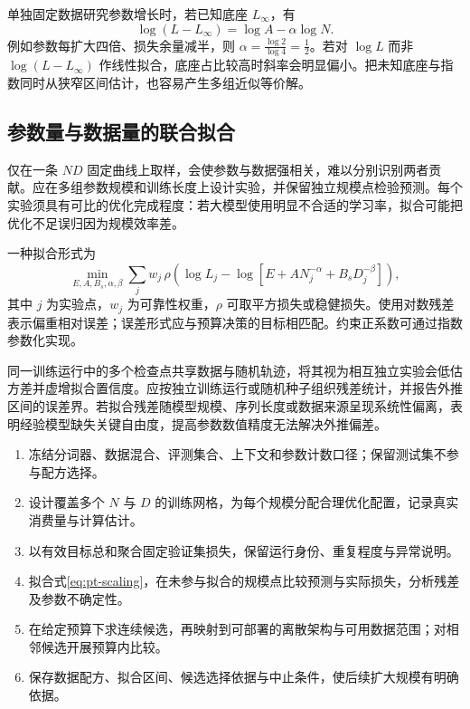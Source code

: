 \documentclass[../textbook.tex]{subfiles}
\begin{document}
单独固定数据研究参数增长时，若已知底座 $L_\infty$，有
\begin{equation}
 \log(L-L_\infty)=\log A-\alpha\log N.
\end{equation}
例如参数每扩大四倍、损失余量减半，则 $\alpha=\frac{\log2}{\log4}=\frac{1}{2}$。若对 $\log L$ 而非 $\log(L-L_\infty)$ 作线性拟合，底座占比较高时斜率会明显偏小。把未知底座与指数同时从狭窄区间估计，也容易产生多组近似等价解。

\subsection{参数量与数据量的联合拟合}
仅在一条 $ND$ 固定曲线上取样，会使参数与数据强相关，难以分别识别两者贡献。应在多组参数规模和训练长度上设计实验，并保留独立规模点检验预测。每个实验须具有可比的优化完成程度：若大模型使用明显不合适的学习率，拟合可能把优化不足误归因为规模效率差。

一种拟合形式为
\begin{equation}
 \min_{E,A,B_s,\alpha,\beta}\sum_{j}w_j\,
\rho\!\left(
 \log L_j-\log[E+AN_j^{-\alpha}+B_sD_j^{-\beta}]\right),
 \label{eq:pt-fit}
\end{equation}
其中 $j$ 为实验点，$w_j$ 为可靠性权重，$\rho$ 可取平方损失或稳健损失。使用对数残差表示偏重相对误差；误差形式应与预算决策的目标相匹配。约束正系数可通过指数参数化实现。

同一训练运行中的多个检查点共享数据与随机轨迹，将其视为相互独立实验会低估方差并虚增拟合置信度。应按独立训练运行或随机种子组织残差统计，并报告外推区间的误差界。若拟合残差随模型规模、序列长度或数据来源呈现系统性偏离，表明经验模型缺失关键自由度，提高参数数值精度无法解决外推偏差。

\begin{algorithm}[规模拟合与预算候选生成]
\begin{enumerate}
\item 冻结分词器、数据混合、评测集合、上下文和参数计数口径；保留测试集不参与配方选择。
\item 设计覆盖多个 $N$ 与 $D$ 的训练网格，为每个规模分配合理优化配置，记录真实消费量与计算估计。
\item 以有效目标总和聚合固定验证集损失，保留运行身份、重复程度与异常说明。
\item 拟合式\eqref{eq:pt-scaling}，在未参与拟合的规模点比较预测与实际损失，分析残差及参数不确定性。
\item 在给定预算下求连续候选，再映射到可部署的离散架构与可用数据范围；对相邻候选开展预算内比较。
\item 保存数据配方、拟合区间、候选选择依据与中止条件，使后续扩大规模有明确依据。
\end{enumerate}
\end{algorithm}
\end{document}
